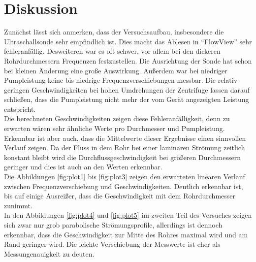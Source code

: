 \section{Diskussion}
Zunächst lässt sich anmerken, dass der Versuchsaufbau, insbesondere die Ultraschallsonde sehr empfindlich ist. Dies macht das Ablesen in \enquote{FlowView} sehr fehleranfällig. Desweiteren war es 
oft schwer, vor allem bei den dickeren Rohrdurchmessern Frequenzen festzustellen. Die Ausrichtung der Sonde hat schon bei kleinen Änderung eine große Auswirkung. Außerdem war bei niedriger Pumpleistung
keine bis niedrige Frequenzverschiebungen messbar. Die relativ geringen Geschwindigkeiten bei hohen Umdrehungen der Zentrifuge lassen darauf schließen, dass die Pumpleistung nicht mehr der vom Gerät angezeigten Leistung entspricht.
\\
\newline
Die berechneten Geschwindigkeiten zeigen diese Fehleranfälligkeit, denn zu erwarten wären sehr ähnliche Werte pro Durchmesser und Pumpleistung. Erkennbar ist aber auch, dass die Mittelwerte dieser Ergebnisse 
einen sinnvollen Verlauf zeigen. Da der Fluss in dem Rohr bei einer laminaren Strömung zeitlich konstant bleibt wird die Durchflussgeschwindigkeit bei größeren Durchmessern geringer und dies ist auch an den Werten erkennbar.
\\
\newline
Die Abbildungen \ref{fig:plot1} bis \ref{fig:plot3} zeigen den erwarteten linearen Verlauf zwischen Frequenzverschiebung und Geschwindigkeiten. Deutlich erkennbar ist, bis auf einige Ausreißer, dass die Geschwindigkeit mit dem Rohrdurchmesser
zunimmt.
\\
\newline
In den Abbildungen \ref{fig:plot4} und \ref{fig:plot5} im zweiten Teil des Versuches zeigen sich zwar nur grob parabolische Strömungsprofile, allerdings ist dennoch
erkennbar, dass die Geschwindigkeit zur Mitte des Rohres maximal wird und am Rand geringer wird. Die leichte Verschiebung der Messwerte ist eher als Messungenauigkeit zu deuten.



